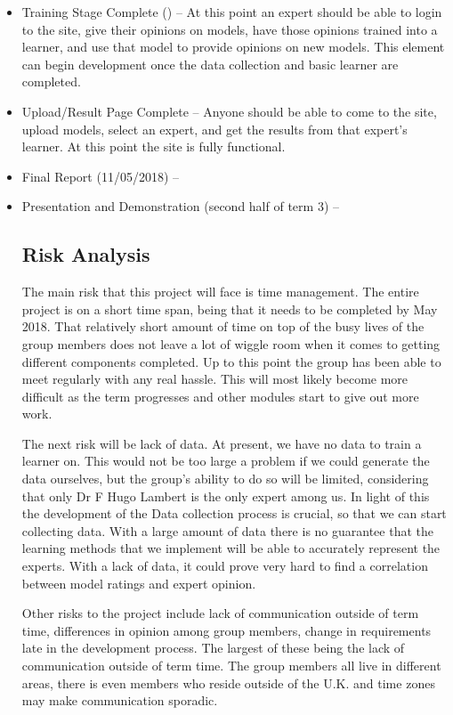 \documentclass[11pt]{article} %
\numberwithin{equation}{section}
\begin{document}
\begin{itemize}
\item Training Stage Complete () – At this point an expert should be able to login to the site, give their opinions on models, have those opinions trained into a learner, and use that model to provide opinions on new models. This element can begin development once the data collection and basic learner are completed.

\item Upload/Result Page Complete – Anyone should be able to come to the site, upload models, select an expert, and get the results from that expert’s learner. At this point the site is fully functional.

\item Final Report (11/05/2018) –

\item Presentation and Demonstration (second half of term 3) –

\subsection{Risk Analysis}

\quad The main risk that this project will face is time management. The entire project is on a short time span, being that it needs to be completed by May 2018. That relatively short amount of time on top of the busy lives of the group members does not leave a lot of wiggle room when it comes to getting different components completed. Up to this point the group has been able to meet regularly with any real hassle. This will most likely become more difficult as the term progresses and other modules start to give out more work. \par

\quad The next risk will be lack of data. At present, we have no data to train a learner on. This would not be too large a problem if we could generate the data ourselves, but the group’s ability to do so will be limited, considering that only Dr F Hugo Lambert is the only expert among us. In light of this the development of the Data collection process is crucial, so that we can start collecting data. With a large amount of data there is no guarantee that the learning methods that we implement will be able to accurately represent the experts. With a lack of data, it could prove very hard to find a correlation between model ratings and expert opinion.\par

\quad Other risks to the project include lack of communication outside of term time, differences in opinion among group members, change in requirements late in the development process. The largest of these being the lack of communication outside of term time. The group members all live in different areas, there is even members who reside outside of the U.K. and time zones may make communication sporadic. \par


\end{itemize}
\end{document}
